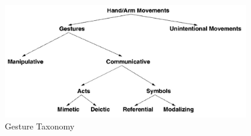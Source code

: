\begin{figure}
	[h] \centering 
	\includegraphics[height=5cm]{figures/content/ges-tax.jpg} \caption{Gesture Taxonomy} \label{fg:ges:tax} 
\end{figure}
